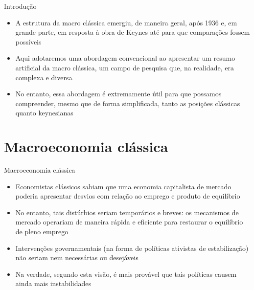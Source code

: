 \documentclass[10pt]{beamer}
\begin{document}
\begin{frame}{Introdução}
    \begin{itemize}
        \item A estrutura da macro clássica emergiu, de maneira geral, após 1936 e, em grande parte, em resposta à obra de Keynes até para que comparações fossem possíveis\bigskip

        \item Aqui adotaremos uma abordagem convencional ao apresentar um resumo artificial da macro clássica, um campo de pesquisa que, na realidade, era complexa e diversa\bigskip

        \item No entanto, essa abordagem é extremamente útil para que possamos compreender, mesmo que de forma simplificada, tanto as posições clássicas quanto keynesianas
    \end{itemize}
\end{frame}

\section{Macroeconomia clássica}
\begin{frame}{Macroeconomia clássica}
    \begin{itemize}
        \item Economistas clássicos sabiam que uma economia capitalista de mercado poderia apresentar desvios com relação ao emprego e produto de equilíbrio\bigskip

        \item No entanto, tais distúrbios seriam temporários e breves: os mecanismos de mercado operariam de maneira  rápida e eficiente para restaurar o equilíbrio de pleno emprego\bigskip

        \item Intervenções governamentais (na forma de políticas ativistas de estabilização) não seriam nem necessárias ou desejáveis\bigskip

        \item Na verdade, segundo esta visão, é mais provável que tais políticas causem ainda mais instabilidades
    \end{itemize}
\end{frame}
\end{document}
